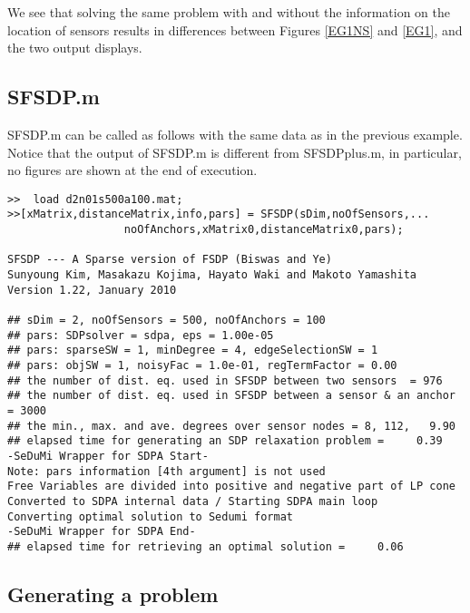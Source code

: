 \documentclass[12pt]{article}
\begin{document}
We see that solving the same problem with and without the information on the location of sensors
results in  differences between Figures  \ref{EG1NS} and \ref{EG1},  and the two output
displays. 

\subsection{SFSDP.m}

SFSDP.m can be called as follows with the same data as in the previous example.
Notice that the output of SFSDP.m is different from SFSDPplus.m, in particular, 
no figures are shown at the end of
execution.
\begin{verbatim}
>>  load d2n01s500a100.mat;
>>[xMatrix,distanceMatrix,info,pars] = SFSDP(sDim,noOfSensors,...
                  noOfAnchors,xMatrix0,distanceMatrix0,pars);

SFSDP --- A Sparse version of FSDP (Biswas and Ye)
Sunyoung Kim, Masakazu Kojima, Hayato Waki and Makoto Yamashita
Version 1.22, January 2010

## sDim = 2, noOfSensors = 500, noOfAnchors = 100
## pars: SDPsolver = sdpa, eps = 1.00e-05
## pars: sparseSW = 1, minDegree = 4, edgeSelectionSW = 1
## pars: objSW = 1, noisyFac = 1.0e-01, regTermFactor = 0.00
## the number of dist. eq. used in SFSDP between two sensors  = 976
## the number of dist. eq. used in SFSDP between a sensor & an anchor = 3000
## the min., max. and ave. degrees over sensor nodes = 8, 112,   9.90
## elapsed time for generating an SDP relaxation problem =     0.39
-SeDuMi Wrapper for SDPA Start-
Note: pars information [4th argument] is not used
Free Variables are divided into positive and negative part of LP cone
Converted to SDPA internal data / Starting SDPA main loop
Converting optimal solution to Sedumi format
-SeDuMi Wrapper for SDPA End-
## elapsed time for retrieving an optimal solution =     0.06
\end{verbatim}

\subsection{Generating a problem}
\end{document}
